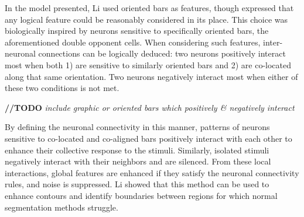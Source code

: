 \documentclass[journal,onecolumn]{IEEEtran}
\begin{document}
In the model presented, Li used oriented bars as features, though expressed that any logical feature could be reasonably considered in its place. This choice was biologically inspired by neurons sensitive to specifically oriented bars, the aforementioned double opponent cells. When considering such features, inter-neuronal connections can be logically deduced: two neurons positively interact most when both 1) are sensitive to similarly oriented bars and 2) are co-located along that same orientation. Two neurons negatively interact most when either of these two conditions is not met.

\textbf{//TODO} \textit{include graphic or oriented bars which positively \& negatively interact}

By defining the neuronal connectivity in this manner, patterns of neurons sensitive to co-located and co-aligned bars positively interact with each other to enhance their collective response to the stimuli. Similarly, isolated stimuli negatively interact with their neighbors and are silenced. From these local interactions, global features are enhanced if they satisfy the neuronal connectivity rules, and noise is suppressed. Li showed that this method can be used to enhance contours and identify boundaries between regions for which normal segmentation methods struggle.
\end{document}
